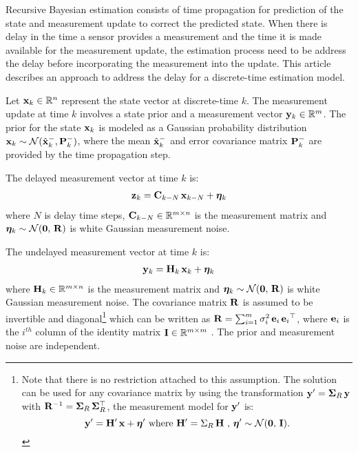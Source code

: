 

Recursive Bayesian estimation consists of time propagation for prediction of the state and measurement update to correct the predicted state.
When there is delay in the time a sensor provides a measurement and the time it is made available for the measurement update, the estimation process need to be address the delay before incorporating the measurement into the update.
This article describes an approach to address the delay for a discrete-time estimation model.

Let $\mathbf{x}_k \in\mathbb{R}^n$ represent the state vector at discrete-time $k$.
The measurement update at time $k$ involves a state prior and a measurement vector $\mathbf{y}_k\in\mathbb{R}^m$.
%
The prior for the state $\mathbf{x}_k$ is modeled as a Gaussian probability distribution $\mathbf{x}_k \sim \mathcal{N}(\hat{\mathbf{x}}_k^-,\mathbf{P}_k^-)$, where the mean $\hat{\mathbf{x}}_k^-$ and error covariance matrix $\mathbf{P}_k^-$ are provided by the time propagation step.
  
The delayed measurement vector at time $k$ is:
\begin{align} \label{eqn:MeasurementModel}
	\mathbf{z}_{k} = \mathbf{C}_{k-N} \, \mathbf{x}_{k-N} + \boldsymbol{\eta}_k
\end{align}
where $N$ is delay time steps, $\mathbf{C}_{k-N}\in \mathbb{R}^{m \times n}$ is the measurement matrix and $\boldsymbol{\eta}_k \sim \mathcal{N}(\boldsymbol{0},\,\mathbf{R})$ is white Gaussian measurement noise.

The undelayed measurement vector at time $k$ is:
\begin{align} \label{eqn:MeasurementModel}
\mathbf{y}_k = \mathbf{H}_k \, \mathbf{x}_k + \boldsymbol{\eta}_k
\end{align}
where $\mathbf{H}_k \in \mathbb{R}^{m \times n}$ is the measurement matrix and $\boldsymbol{\eta}_k \sim \mathcal{N}(\boldsymbol{0},\,\mathbf{R})$ is white Gaussian measurement noise. The covariance matrix $\mathbf{R}$ is assumed to be invertible and diagonal\footnote
{\label{ftnt:R_assumption}
	Note that there is no restriction attached to this assumption. The solution can be used for any  covariance matrix by using the transformation $\mathbf{y}' =\boldsymbol{\Sigma}_R  \, \mathbf{y}$ with $\mathbf{R}^{-1} = \boldsymbol{\Sigma}_R \, \boldsymbol{\Sigma}_R^\top$, the measurement model for $\mathbf{y}'$ is:
	$$\mathbf{y}'=\mathbf{H}' \,\mathbf{x}+\boldsymbol{\eta}' \mbox{ where } \mathbf{H}' = \Sigma_R  \, \mathbf{H} \mbox{ , } \boldsymbol{\eta}' \sim \mathcal{N}(\boldsymbol{0},\,\mathbf{I}).$$
} 
which can be written as $\mathbf{R} = \sum_{i=1}^{m} \sigma_{i}^2 \, \mathbf{e}_i  \,{\mathbf{e}_i}^\top$, where $\mathbf{e}_i$ is the $i^{th}$ column of the identity matrix $\mathbf{I} \in \mathbb{R}^{m \times m}$ .
The prior and measurement noise are independent.
